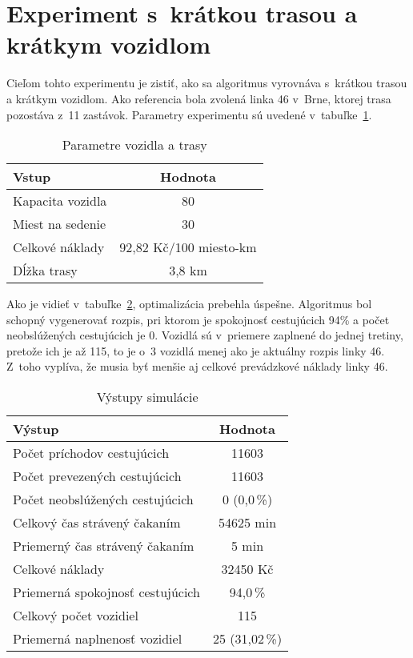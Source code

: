 \newpage
\section{Experiment s~krátkou trasou a krátkym vozidlom}
Cieľom tohto experimentu je zistiť, ako sa algoritmus vyrovnáva s~krátkou trasou a krátkym vozidlom.
Ako referencia bola zvolená linka 46 v~Brne, ktorej trasa pozostáva z~11 zastávok.
Parametry experimentu sú uvedené v~tabuľke~\ref{tab:shortDshortVin}.

\begin{table}[h]
  \centering
  \begin{tabular}{|l|c|}
    \hline
    \textbf{Vstup} & \textbf{Hodnota} \\ \hline
    Kapacita vozidla & 80 \\ \hline
    Miest na sedenie & 30 \\ \hline
    Celkové náklady & 92,82 Kč/100 miesto-km \\ \hline
    Dĺžka trasy & 3,8 km \\ \hline
  \end{tabular}
  \caption{Parametre vozidla a trasy}
  \label{tab:shortDshortVin}
\end{table}

Ako je vidieť v~tabuľke~\ref{tab:shortDshortVout}, optimalizácia prebehla úspešne.
Algoritmus bol schopný vygenerovať rozpis, pri ktorom je spokojnosť cestujúcich 94\% a počet neobslúžených cestujúcich je 0.
Vozidlá sú v~priemere zaplnené do jednej tretiny, pretože ich je až 115, to je o~3 vozidlá menej ako je aktuálny rozpis linky 46.
Z~toho vyplíva, že musia byť menšie aj celkové prevádzkové náklady linky 46.

\begin{table}[h]
  \centering
  \begin{tabular}{|l|c|}
    \hline
      \textbf{Výstup} & \textbf{Hodnota} \\ \hline
      Počet príchodov cestujúcich & 11603 \\ \hline
      Počet prevezených cestujúcich & 11603 \\ \hline
      Počet neobslúžených cestujúcich & 0 (0,0\,\%) \\ \hline
      Celkový čas strávený čakaním & 54625 min \\ \hline
      Priemerný čas strávený čakaním & 5 min \\ \hline
      Celkové náklady & 32450 Kč \\ \hline
      Priemerná spokojnosť cestujúcich & 94,0\,\% \\ \hline
      Celkový počet vozidiel & 115 \\ \hline
      Priemerná naplnenosť vozidiel & 25 (31,02\,\%) \\ \hline
  \end{tabular}
  \caption{Výstupy simulácie}
  \label{tab:shortDshortVout}
\end{table}

